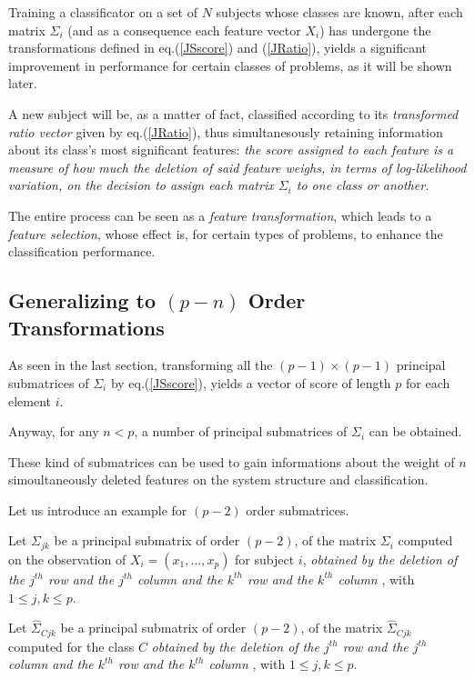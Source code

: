 \documentclass[12pt,openright,twoside,a4paper]{book}
\begin{document}
Training a classificator on a set of $N$ subjects whose classes are known, after each matrix $\Sigma_i$ (and as a consequence each feature vector $X_i$) has undergone the transformations defined in eq.(\ref{JSscore}) and (\ref{JRatio}), yields a significant improvement in performance for certain classes of problems, as it will be shown later.

A new subject will be, as a matter of fact, classified according to its \textit{transformed ratio vector} given by eq.(\ref{JRatio}), thus simultanesously retaining information about its class's most significant features: \textit{the score assigned to each feature is a measure of how much the deletion of said feature weighs, in terms of log-likelihood variation, on the decision to assign each matrix $\Sigma_i$ to one class or another.}
\vspace{5mm}

The entire process can be seen as a \textit{feature transformation}, which leads to a \textit{feature selection}, whose effect is, for certain types of problems, to enhance the classification performance.

\subsection{Generalizing to $(p-n)$ Order Transformations}
As seen in the last section, transforming all the $(p-1) \times (p-1)$ principal submatrices of $\Sigma_i$ by eq.(\ref{JSscore}), yields a vector of score of length $p$ for each element $i$.

Anyway, for any $n<p$, a number of principal submatrices of $\Sigma_i$ can be obtained.

These kind of submatrices can be used to gain informations about the weight of $n$ simoultaneously deleted features on the system structure and classification.

Let us introduce an example for $(p-2)$ order submatrices.
\vspace{5mm}

Let $\Sigma_{jk}$ be a principal submatrix of order $(p-2)$, of the matrix $\Sigma_i$ computed on the observation of $X_i=(x_1,...,x_p)$ for subject $i$, \textit{obtained by the deletion of the $j^{th}$ row and the $j^{th}$ column and the $k^{th}$ row and the $k^{th}$ column }, with $ 1\leq j,k\leq p$.
\vspace{5mm}

Let  $\hat{\Sigma}_{Cjk}$  be a principal submatrix of order $(p-2)$, of the matrix $\hat{\Sigma}_{Cjk}$ computed for the class $C$ \textit{obtained by the deletion of the $j^{th}$ row and the $j^{th}$ column and the $k^{th}$ row and the $k^{th}$ column }, with $ 1\leq j,k\leq p$.
\vspace{5mm}
\end{document}
